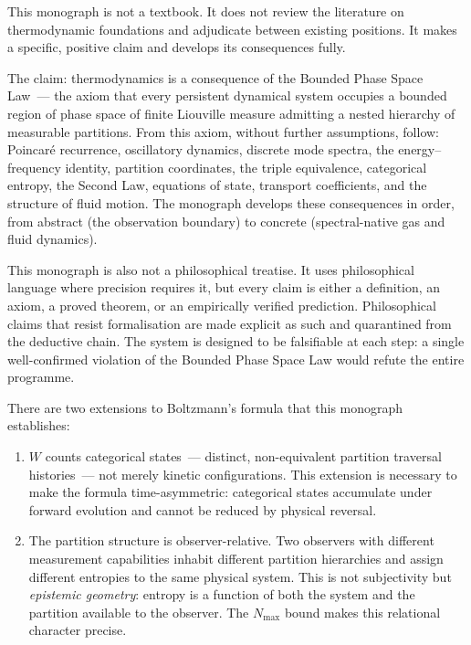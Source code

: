 This monograph is not a textbook. It does not review the literature on thermodynamic
foundations and adjudicate between existing positions. It makes a specific, positive
claim and develops its consequences fully.

The claim: thermodynamics is a consequence of the Bounded Phase Space Law~---
the axiom that every persistent dynamical system occupies a bounded region of phase
space of finite Liouville measure admitting a nested hierarchy of measurable partitions.
From this axiom, without further assumptions, follow: Poincaré recurrence, oscillatory
dynamics, discrete mode spectra, the energy--frequency identity, partition coordinates,
the triple equivalence, categorical entropy, the Second Law, equations of state,
transport coefficients, and the structure of fluid motion. The monograph develops
these consequences in order, from abstract (the observation boundary) to concrete
(spectral-native gas and fluid dynamics).

This monograph is also not a philosophical treatise. It uses philosophical language
where precision requires it, but every claim is either a definition, an axiom,
a proved theorem, or an empirically verified prediction. Philosophical claims that
resist formalisation are made explicit as such and quarantined from the deductive chain.
The system is designed to be falsifiable at each step: a single well-confirmed violation
of the Bounded Phase Space Law would refute the entire programme.

There are two extensions to Boltzmann's formula that this monograph establishes:

\begin{enumerate}[label=(\roman*),leftmargin=2em,itemsep=4pt]
  \item $W$ counts categorical states~--- distinct, non-equivalent partition traversal
    histories~--- not merely kinetic configurations. This extension is necessary to
    make the formula time-asymmetric: categorical states accumulate under forward
    evolution and cannot be reduced by physical reversal.

  \item The partition structure is observer-relative. Two observers with different
    measurement capabilities inhabit different partition hierarchies and assign different
    entropies to the same physical system. This is not subjectivity but
    \emph{epistemic geometry}: entropy is a function of both the system and the
    partition available to the observer. The $N_{\max}$ bound makes this relational
    character precise.
\end{enumerate}

